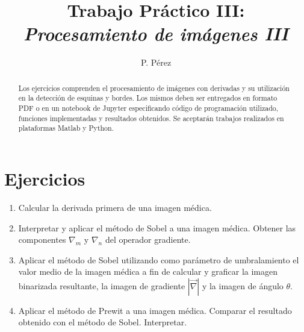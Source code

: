\documentclass[a4paper,10pt]{article}
\title{{\bf Trabajo Práctico III:}\\ \emph{Procesamiento de imágenes III}}
\author{P. Pérez}
\begin{document}
\maketitle

\begin{abstract}
Los ejercicios comprenden el procesamiento de imágenes con derivadas y su utilización en la detección de esquinas y bordes. Los mismos deben ser entregados en formato PDF o en un notebook de Jupyter especificando código de programación utilizado, funciones implementadas y resultados obtenidos. Se aceptarán trabajos realizados en plataformas Matlab y Python.
\end{abstract}

\section*{Ejercicios}

\begin{enumerate}
 \item Calcular la derivada primera de una imagen médica.
 \item Interpretar y aplicar el método de Sobel a una imagen médica. Obtener las componentes $\nabla_{m}$ y $\nabla_{n}$ del operador gradiente.
 \item Aplicar el método de Sobel utilizando como parámetro de umbralamiento el valor medio de la imagen médica a fin de calcular y graficar la imagen binarizada resultante, la imagen de gradiente $|\vec{\nabla}|$ y la imagen de ángulo $\theta$.
 \item Aplicar el método de Prewit a una imagen médica. Comparar el resultado obtenido con el método de Sobel. Interpretar.
\end{enumerate}
\end{document}
